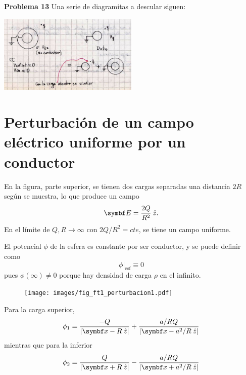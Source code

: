 \documentclass[10pt,oneside]{CBFT_book}
\begin{document}
\begin{ejemplo}{\bf Problema 13}
Una serie de diagramitas a descular siguen:

\includegraphics[width=0.5\textwidth]{images/fig_ft1_problema_13b.jpg}
 
\end{ejemplo}



\section{Perturbación de un campo eléctrico uniforme por un conductor}

En la figura, parte superior, se tienen dos cargas separadas una distancia $2R$ según se muestra,
lo que produce un campo 
\[
	\vb{E} = \frac{2Q}{R^2}  \zver.
\]
En el límite de $Q,R \to \infty$ con $2Q/R^2 = cte$, se tiene un campo uniforme.

El potencial $\phi$ de la esfera es constante por ser conductor, y se puede definir como
\[
	\phi|_{\text{esf}} \equiv 0
\]
pues $\phi(\infty)\neq 0 $ porque hay densidad de carga $\rho$ en el infinito.

\begin{figure}[htb]
	\begin{center}
	\texttt{[image: images/fig\_ft1\_perturbacion1.pdf]}	 
	\end{center}
	\caption{}
\end{figure}
Para la carga superior,
\[
	\phi_1 = \frac{-Q}{|\vb{x} - R\zver|} + \frac{a/R Q}{|\vb{x} - a^2/R \zver|}
\]
mientras que para la inferior
\[
	\phi_2 = \frac{Q}{|\vb{x} + R\zver|} - \frac{ a/R Q}{|\vb{x} + a^2/R \zver|}
\]
\end{document}
